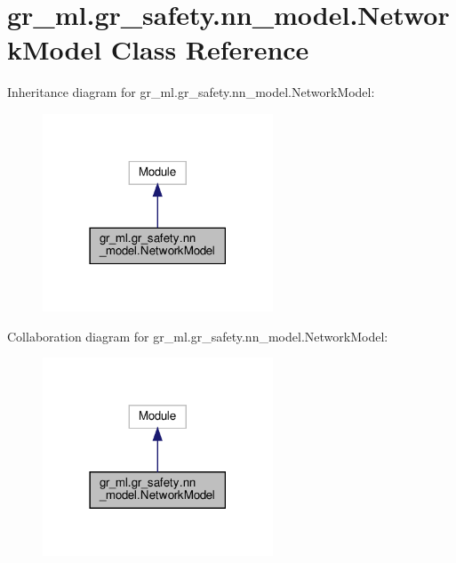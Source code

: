 \hypertarget{classgr__ml_1_1gr__safety_1_1nn__model_1_1NetworkModel}{}\section{gr\+\_\+ml.\+gr\+\_\+safety.\+nn\+\_\+model.\+Network\+Model Class Reference}
\label{classgr__ml_1_1gr__safety_1_1nn__model_1_1NetworkModel}


Inheritance diagram for gr\+\_\+ml.\+gr\+\_\+safety.\+nn\+\_\+model.\+Network\+Model\+:
\nopagebreak
\begin{figure}[H]
\begin{center}
\leavevmode
\includegraphics[width=194pt]{classgr__ml_1_1gr__safety_1_1nn__model_1_1NetworkModel__inherit__graph}
\end{center}
\end{figure}


Collaboration diagram for gr\+\_\+ml.\+gr\+\_\+safety.\+nn\+\_\+model.\+Network\+Model\+:
\nopagebreak
\begin{figure}[H]
\begin{center}
\leavevmode
\includegraphics[width=194pt]{classgr__ml_1_1gr__safety_1_1nn__model_1_1NetworkModel__coll__graph}
\end{center}
\end{figure}
